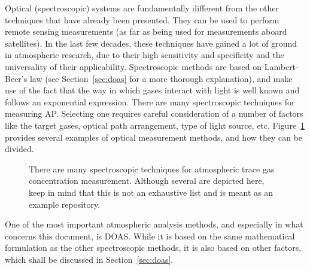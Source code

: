 Optical (spectroscopic) systems are fundamentally different from the
other techniques that have already been presented. They can be used to
perform remote sensing measurements (as far as being used for
measurements aboard satellites). In the last few decades, these
techniques have gained a lot of ground in atmospheric research, due to
their high sensitivity and specificity and the universality of their
applicability. Spectroscopic methods are based on Lambert-Beer's law
(see Section~\ref{sec:doas} for a more thorough explanation), and make
use of the fact that the way in which gases interact with light is well
known and follows an exponential expression. There are many
spectroscopic techniques for measuring \gls{AP}. Selecting one requires
careful consideration of a number of factors like the target gases,
optical path arrangement, type of light source, etc.
Figure~\ref{fig:selecting_spectroscopic_method} provides several
examples of optical measurement methods, and how they can be divided.

\begin{figure}[htpb]
    \centering
    \missingfigure{}
    \caption{There are many spectroscopic techniques for atmospheric
    trace gas concentration measurement. Although several are depicted
    here, keep in mind that this is not an exhaustive list and is meant as
    an example repository.}
    \label{fig:selecting_spectroscopic_method}
\end{figure}

One of the most important atmospheric analysis methods, and especially
in what concerns this document, is \gls{DOAS}. While it is based on the
same mathematical formulation as the other spectroscopic methods, it is
also based on other factors, which shall be discussed in
Section~\ref{sec:doas}.

